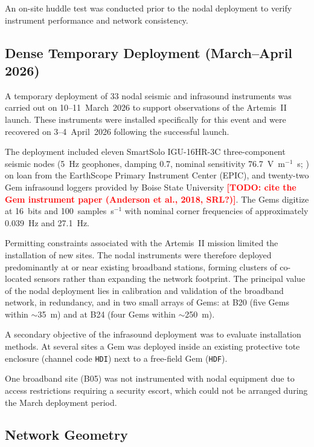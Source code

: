 \documentclass[]{seismica}
\newcommand{\todo}[1]{\textcolor{red}{\textbf{[TODO: #1]}}}
\begin{document}
An on-site huddle test was conducted prior to the nodal deployment to
verify instrument performance and network consistency.

\subsection{Dense Temporary Deployment (March--April 2026)}

A temporary deployment of 33 nodal seismic and infrasound instruments
was carried out on 10--11~March~2026 to support observations of the
Artemis~II launch. These instruments were installed specifically for
this event and were recovered on 3--4~April~2026 following the
successful launch.

The deployment included eleven SmartSolo IGU-16HR-3C three-component
seismic nodes (5~Hz geophones, damping 0.7, nominal sensitivity
76.7~V~m$^{-1}$~s; \citealp{SmartSolo2023}) on loan from the EarthScope
Primary Instrument Center (EPIC), and twenty-two Gem infrasound loggers
provided by Boise State University \todo{cite the Gem instrument paper
(Anderson et al., 2018, SRL?)}. The Gems digitize at 16~bits and
100~samples~s$^{-1}$ with nominal corner frequencies of approximately
0.039~Hz and 27.1~Hz.

Permitting constraints associated with the Artemis~II mission limited
the installation of new sites. The nodal instruments were therefore
deployed predominantly at or near existing broadband stations, forming
clusters of co-located sensors rather than expanding the network
footprint. The principal value of the nodal deployment lies in
calibration and validation of the broadband network, in redundancy, and
in two small arrays of Gems: at B20 (five Gems within $\sim$35~m) and at
B24 (four Gems within $\sim$250~m).

A secondary objective of the infrasound deployment was to evaluate
installation methods. At several sites a Gem was deployed inside an
existing protective tote enclosure (channel code \texttt{HDI}) next to a
free-field Gem (\texttt{HDF}).

One broadband site (B05) was not instrumented with nodal equipment due
to access restrictions requiring a security escort, which could not be
arranged during the March deployment period.

\subsection{Network Geometry}
\end{document}
